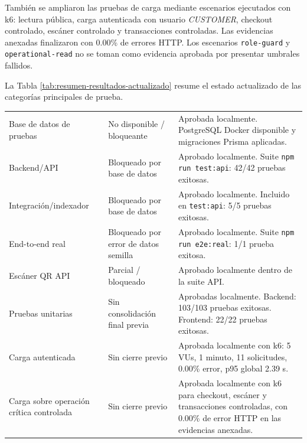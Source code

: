 \documentclass[12pt,letterpaper]{article}
\begin{document}
También se ampliaron las pruebas de carga mediante escenarios ejecutados con k6: lectura pública, carga autenticada con usuario \textit{CUSTOMER}, checkout controlado, escáner controlado y transacciones controladas. Las evidencias anexadas finalizaron con 0.00\% de errores HTTP. Los escenarios \texttt{role-guard} y \texttt{operational-read} no se toman como evidencia aprobada por presentar umbrales fallidos.

La Tabla \ref{tab:resumen-resultados-actualizado} resume el estado actualizado de las categorías principales de prueba.

\begin{table}[H]
\centering
\begingroup
\scriptsize
\setlength{\tabcolsep}{3pt}
\renewcommand{\arraystretch}{1.18}

\begin{tabularx}{\textwidth}{|
>{\raggedright\arraybackslash}p{3.5cm}|
>{\raggedright\arraybackslash}p{3.7cm}|
>{\raggedright\arraybackslash}X|}
\hline
\multicolumn{1}{|>{\centering\arraybackslash}m{3.5cm}|}{\textbf{Categoría}} &
\multicolumn{1}{>{\centering\arraybackslash}m{3.7cm}|}{\textbf{Estado anterior}} &
\multicolumn{1}{>{\centering\arraybackslash}m{7.1cm}|}{\textbf{Estado actualizado}} \\
\hline
Base de datos de pruebas & No disponible / bloqueante & Aprobada localmente. PostgreSQL Docker disponible y migraciones Prisma aplicadas. \\
\hline
Backend/API & Bloqueado por base de datos & Aprobado localmente. Suite \texttt{npm run test:api}: 42/42 pruebas exitosas. \\
\hline
Integración/indexador & Bloqueado por base de datos & Aprobado localmente. Incluido en \texttt{test:api}: 5/5 pruebas exitosas. \\
\hline
End-to-end real & Bloqueado por error de datos semilla & Aprobado localmente. Suite \texttt{npm run e2e:real}: 1/1 prueba exitosa. \\
\hline
Escáner QR API & Parcial / bloqueado & Aprobado localmente dentro de la suite API. \\
\hline
Pruebas unitarias & Sin consolidación final previa & Aprobadas localmente. Backend: 103/103 pruebas exitosas. Frontend: 22/22 pruebas exitosas. \\
\hline
Carga autenticada & Sin cierre previo & Aprobada localmente con k6: 5 VUs, 1 minuto, 11 solicitudes, 0.00\% error, p95 global 2.39 s. \\
\hline
Carga sobre operación crítica controlada & Sin cierre previo & Aprobada localmente con k6 para checkout, escáner y transacciones controladas, con 0.00\% de error HTTP en las evidencias anexadas. \\

\end{tabularx}
\end{table}
\end{document}
